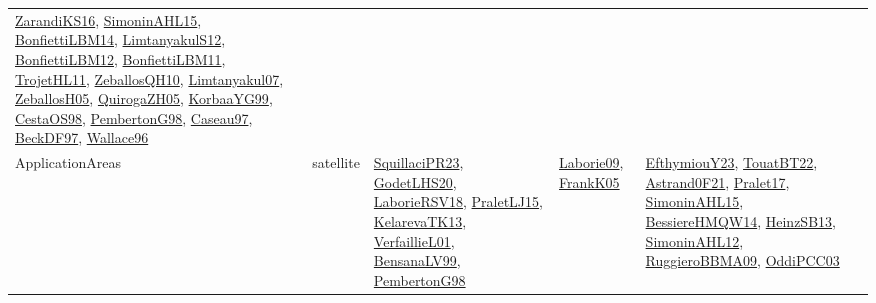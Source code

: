 {\begin{longtable}{lp{3cm}>{\raggedright}p{6cm}>{\raggedright}p{6cm}p{8cm}}
\href{articles/ZarandiKS16.pdf}{ZarandiKS16}\cite{ZarandiKS16}, \href{articles/SimoninAHL15.pdf}{SimoninAHL15}\cite{SimoninAHL15}, \href{articles/BonfiettiLBM14.pdf}{BonfiettiLBM14}\cite{BonfiettiLBM14}, \href{articles/LimtanyakulS12.pdf}{LimtanyakulS12}\cite{LimtanyakulS12}, \href{papers/BonfiettiLBM12.pdf}{BonfiettiLBM12}\cite{BonfiettiLBM12}, \href{papers/BonfiettiLBM11.pdf}{BonfiettiLBM11}\cite{BonfiettiLBM11}, \href{articles/TrojetHL11.pdf}{TrojetHL11}\cite{TrojetHL11}, \href{articles/ZeballosQH10.pdf}{ZeballosQH10}\cite{ZeballosQH10}, \href{papers/Limtanyakul07.pdf}{Limtanyakul07}\cite{Limtanyakul07}, \href{articles/ZeballosH05.pdf}{ZeballosH05}\cite{ZeballosH05}, \href{papers/QuirogaZH05.pdf}{QuirogaZH05}\cite{QuirogaZH05}, \href{papers/KorbaaYG99.pdf}{KorbaaYG99}\cite{KorbaaYG99}, \href{papers/CestaOS98.pdf}{CestaOS98}\cite{CestaOS98}, \href{papers/PembertonG98.pdf}{PembertonG98}\cite{PembertonG98}, \href{papers/Caseau97.pdf}{Caseau97}\cite{Caseau97}, \href{papers/BeckDF97.pdf}{BeckDF97}\cite{BeckDF97}, \href{articles/Wallace96.pdf}{Wallace96}\cite{Wallace96}\\
ApplicationAreas & satellite & \href{papers/SquillaciPR23.pdf}{SquillaciPR23}\cite{SquillaciPR23}, \href{papers/GodetLHS20.pdf}{GodetLHS20}\cite{GodetLHS20}, \href{articles/LaborieRSV18.pdf}{LaborieRSV18}\cite{LaborieRSV18}, \href{papers/PraletLJ15.pdf}{PraletLJ15}\cite{PraletLJ15}, \href{papers/KelarevaTK13.pdf}{KelarevaTK13}\cite{KelarevaTK13}, \href{papers/VerfaillieL01.pdf}{VerfaillieL01}\cite{VerfaillieL01}, \href{articles/BensanaLV99.pdf}{BensanaLV99}\cite{BensanaLV99}, \href{papers/PembertonG98.pdf}{PembertonG98}\cite{PembertonG98} & \href{papers/Laborie09.pdf}{Laborie09}\cite{Laborie09}, \href{papers/FrankK05.pdf}{FrankK05}\cite{FrankK05} & \href{papers/EfthymiouY23.pdf}{EfthymiouY23}\cite{EfthymiouY23}, \href{papers/TouatBT22.pdf}{TouatBT22}\cite{TouatBT22}, \href{papers/Astrand0F21.pdf}{Astrand0F21}\cite{Astrand0F21}, \href{papers/Pralet17.pdf}{Pralet17}\cite{Pralet17}, \href{articles/SimoninAHL15.pdf}{SimoninAHL15}\cite{SimoninAHL15}, \href{papers/BessiereHMQW14.pdf}{BessiereHMQW14}\cite{BessiereHMQW14}, \href{articles/HeinzSB13.pdf}{HeinzSB13}\cite{HeinzSB13}, \href{papers/SimoninAHL12.pdf}{SimoninAHL12}\cite{SimoninAHL12}, \href{articles/RuggieroBBMA09.pdf}{RuggieroBBMA09}\cite{RuggieroBBMA09}, \href{papers/OddiPCC03.pdf}{OddiPCC03}\cite{OddiPCC03}\\

\end{longtable}}
